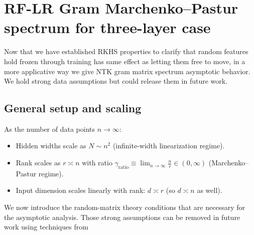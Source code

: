 \section{RF-LR Gram Marchenko–Pastur spectrum for three-layer case}

Now that we have established RKHS properties to clarify that random features hold frozen through training has same effect as letting them free to move,  in a more applicative way we give NTK gram matrix spectrum asymptotic behavior.
We hold strong data assumptions but could release them in future work.

\subsection{General setup and scaling}

\begin{assumption}\label{assump:RMT}
As the number of data points \(n\to\infty\):
\begin{itemize}
    \item Hidden widths scale as \( N \sim n^2 \) (infinite-width linearization regime).
    \item Rank scales as \( r \asymp n \) with ratio \( \gamma_{\mathrm{ratio}} \equiv \lim_{n\to\infty} \tfrac{n}{r} \in (0,\infty) \) (Marchenko–Pastur regime).
    \item Input dimension scales linearly with rank: \( d \asymp r \) (so \( d \asymp n \) as well).
\end{itemize}
\end{assumption}

We now introduce the random-matrix theory conditions that are necessary for the asymptotic analysis. Those strong assumptions can be removed in future work using techniques from \cite{benigni2025eigenvaluedistributionneuraltangent}

